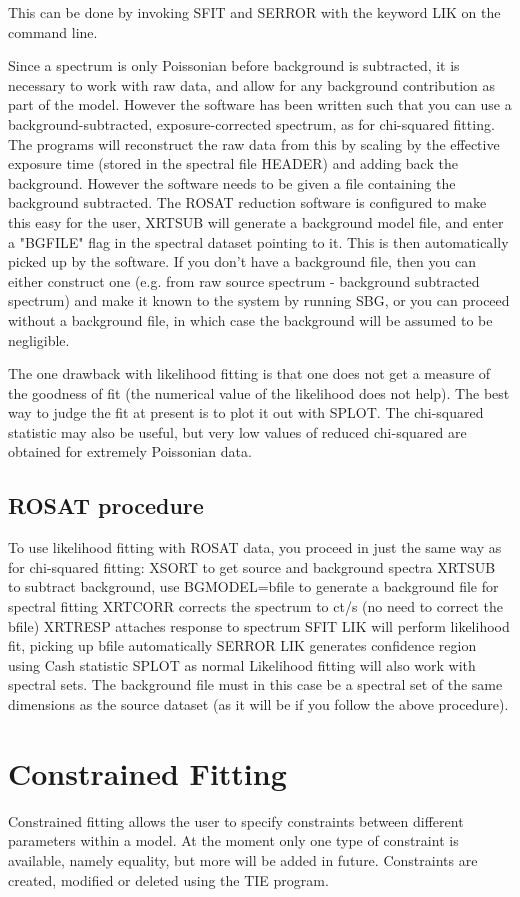 \documentclass{book}
\renewcommand{\_}{{\tt\char'137}}     %
\begin{document}
This can be done by invoking SFIT and SERROR with the keyword LIK on
the command line.

Since a spectrum is only Poissonian before background is subtracted,
it is necessary to work with raw data, and allow for any background
contribution as part of the model. However the software has been
written such that you can use a background-subtracted,
exposure-corrected spectrum, as for chi-squared fitting. The programs
will reconstruct the raw data from this by scaling by the effective
exposure time (stored in the spectral file HEADER) and adding back the
background. However the software needs to be given a file containing
the background subtracted. The ROSAT reduction software is configured
to make this easy for the user, XRTSUB will generate a background
model file, and enter a "BGFILE" flag in the spectral dataset pointing
to it. This is then automatically picked up by the software.
If you don't have a background file, then you can either construct
one (e.g. from raw source spectrum - background subtracted spectrum)
and make it known to the system by running SBG, or you can proceed
without a background file, in which case the background will be
assumed to be negligible.

The one drawback with likelihood fitting is that one does not get
a measure of the goodness of fit (the numerical value of the
likelihood does not help). The best way to judge the fit at
present is to plot it out with SPLOT. The chi-squared statistic
may also be useful, but very low values of reduced chi-squared
are obtained for extremely Poissonian data.

\subsection{ROSAT procedure}
To use likelihood fitting with ROSAT data, you proceed in just the
same way as for chi-squared fitting:
XSORT to get source and background spectra
XRTSUB to subtract background, use BGMODEL=bfile to
generate a background file for spectral fitting
XRTCORR corrects the spectrum to ct/s (no need to
correct the bfile)
XRTRESP attaches response to spectrum
SFIT LIK will perform likelihood fit, picking up bfile
automatically
SERROR LIK generates confidence region using Cash statistic
SPLOT as normal
Likelihood fitting will also work with spectral sets. The background
file must in this case be a spectral set of the same dimensions as
the source dataset (as it will be if you follow the above procedure).
\section{Constrained Fitting}
Constrained fitting allows the user to specify constraints between
different parameters within a model. At the moment only one type of
constraint is available, namely equality, but more will be added in
future. Constraints are created, modified or deleted using the TIE
program.
\end{document}
